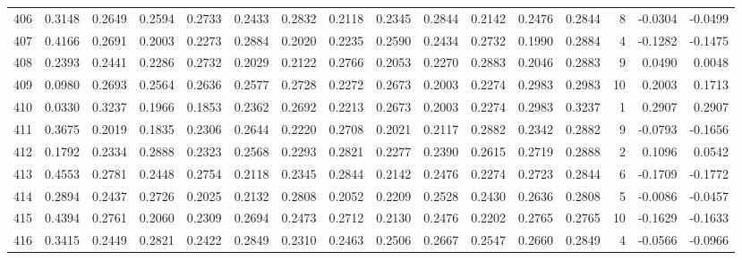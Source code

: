 \begin{tabular}{lrrrrrrrrrrrrrrr}
406 &      0.3148 &  0.2649 &  0.2594 &  0.2733 &  0.2433 &  0.2832 &  0.2118 &  0.2345 &  0.2844 &  0.2142 &   0.2476 &     0.2844 &      8 &                   -0.0304 &                    -0.0499 \\
407 &      0.4166 &  0.2691 &  0.2003 &  0.2273 &  0.2884 &  0.2020 &  0.2235 &  0.2590 &  0.2434 &  0.2732 &   0.1990 &     0.2884 &      4 &                   -0.1282 &                    -0.1475 \\
408 &      0.2393 &  0.2441 &  0.2286 &  0.2732 &  0.2029 &  0.2122 &  0.2766 &  0.2053 &  0.2270 &  0.2883 &   0.2046 &     0.2883 &      9 &                    0.0490 &                     0.0048 \\
409 &      0.0980 &  0.2693 &  0.2564 &  0.2636 &  0.2577 &  0.2728 &  0.2272 &  0.2673 &  0.2003 &  0.2274 &   0.2983 &     0.2983 &     10 &                    0.2003 &                     0.1713 \\
410 &      0.0330 &  0.3237 &  0.1966 &  0.1853 &  0.2362 &  0.2692 &  0.2213 &  0.2673 &  0.2003 &  0.2274 &   0.2983 &     0.3237 &      1 &                    0.2907 &                     0.2907 \\
411 &      0.3675 &  0.2019 &  0.1835 &  0.2306 &  0.2644 &  0.2220 &  0.2708 &  0.2021 &  0.2117 &  0.2882 &   0.2342 &     0.2882 &      9 &                   -0.0793 &                    -0.1656 \\
412 &      0.1792 &  0.2334 &  0.2888 &  0.2323 &  0.2568 &  0.2293 &  0.2821 &  0.2277 &  0.2390 &  0.2615 &   0.2719 &     0.2888 &      2 &                    0.1096 &                     0.0542 \\
413 &      0.4553 &  0.2781 &  0.2448 &  0.2754 &  0.2118 &  0.2345 &  0.2844 &  0.2142 &  0.2476 &  0.2274 &   0.2723 &     0.2844 &      6 &                   -0.1709 &                    -0.1772 \\
414 &      0.2894 &  0.2437 &  0.2726 &  0.2025 &  0.2132 &  0.2808 &  0.2052 &  0.2209 &  0.2528 &  0.2430 &   0.2636 &     0.2808 &      5 &                   -0.0086 &                    -0.0457 \\
415 &      0.4394 &  0.2761 &  0.2060 &  0.2309 &  0.2694 &  0.2473 &  0.2712 &  0.2130 &  0.2476 &  0.2202 &   0.2765 &     0.2765 &     10 &                   -0.1629 &                    -0.1633 \\
416 &      0.3415 &  0.2449 &  0.2821 &  0.2422 &  0.2849 &  0.2310 &  0.2463 &  0.2506 &  0.2667 &  0.2547 &   0.2660 &     0.2849 &      4 &                   -0.0566 &                    -0.0966 \\

\end{tabular}
